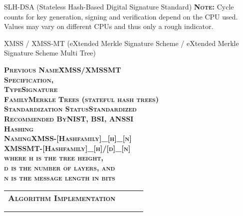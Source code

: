 \documentclass[11pt,english,a4paper, landscape]{scrartcl}
\begin{document}
\begin{algorithmbox}{SLH-DSA (Stateless Hash-Based Digital Signature Standard)}
		{\tiny  {\bfseries \scshape Note:} Cycle counts for key generation, signing and verification depend on the CPU used. Values may vary on different CPUs and thus only a rough indicator.}
	\end{algorithmbox}



	\begin{algorithmbox}{XMSS / XMSS-MT (eXtended Merkle Signature Scheme / eXtended Merkle Signature Scheme Multi Tree)}
		\begin{minipage}[t]{0.35\textwidth}
			\scriptsize
			\begin{center}
			\end{center}
			\begin{tabbing}
				\bfseries \scshape Previous Name\hspace{2.5cm}\=XMSS/XMSSMT\\
				\bfseries \scshape Specification\>, \\


				\bfseries \scshape Type\>Signature\\
				\bfseries \scshape Family\>Merkle Trees (stateful hash trees)\\
				\bfseries \scshape Standardization Status\>Standardized\\
				\bfseries \scshape Recommended By\>NIST, BSI, ANSSI\\
				\bfseries \scshape Hashing\>\tbd\\
				\bfseries \scshape Naming\>XMSS-[Hashfamily]\_[h]\_[n]\\
				\>XMSSMT-[Hashfamily]\_[h]/[d]\_[n]\\
				\> where h is the tree height,\\
				\> d is the number of layers, and\\
				\> n is the message length in bits
			\end{tabbing}
			\begin{tabular}[t]{l c  c  c}
				\scshape\bfseries Algorithm Implementation &\textcolor{themegreydark}{\faKey}&\textcolor{themegreydark}{\faPen}&\textcolor{themegreydark}{\faQuestionCircle}\\
				&&&\\
				\hline\\



\end{tabular}
\end{minipage}
\end{algorithmbox}
\end{document}
